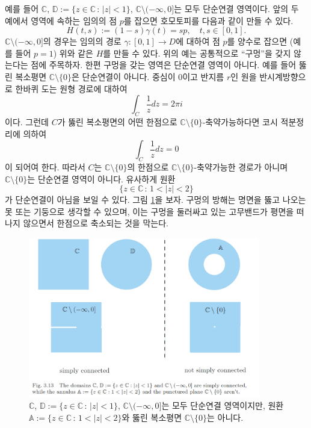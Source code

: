 예를 들어 $\mathbb C$, $\mathbb D:=\{z\in\mathbb C\,:\, |z|<1\}$,
$\mathbb C\setminus(-\infty,0]$는 모두 단순연결 영역이다.
앞의 두 예에서 영역에 속하는 임의의 점 $p$를 잡으면 호모토피를 다음과 같이 만들 수 있다.
\[
H(t,s) := (1-s)\gamma(t) = sp, \quad t,s\in[0,1].
\]
$\mathbb C\setminus(-\infty,0]$의 경우는
임의의 경로 $\gamma: [0,1] \to D$에 대하여
점 $p$를 양수로 잡으면 (예를 들어 $p=1$) 위와 같은 $H$를 만들 수 있다.
위의 예는 공통적으로 ``구멍''을 갖지 않는다는 점에 주목하자.
한편 구멍을 갖는 영역은 단순연결 영역이 아니다. 예를 들어
뚫린 복소평면 $\mathbb C\setminus \{0\}$은 단순연결이 아니다.
중심이 $0$이고 반지름 $r$인 원을 반시계방향으로 한바퀴 도는 원형 경로에 대하여
\[
\int_C \dfrac 1z dz = 2\pi i
\]
이다. 그런데 $C$가 뚫린 복소평면의 어떤 한점으로 
$\mathbb C\setminus \{0\}$-축약가능하다면
코시 적분정리에 의하여
\[
\int_C \dfrac 1z dz = 0
\]
이 되어여 한다.
따라서 $C$는 $\mathbb C\setminus \{0\}$의 한점으로 $\mathbb C\setminus \{0\}$-축약가능한 
경로가 아니며 $\mathbb C\setminus \{0\}$는 단순연결 영역이 아니다.
유사하게 원환
\[
\{ z\in\mathbb C \,:\,  1<|z|<2 \}
\]
가 단순연결이 아님을 보일 수 있다.
그림 \ref{fig-3-13}을 보자.
구멍의 방해는 명면을 뚫고 나오는 못 또는 기둥으로 생각할 수 있으며,
이는 구멍을 둘러싸고 있는 고무밴드가 평면을 떠나지 않으면서
한점으로 축소되는 것을 막는다.
\begin{figure}[!h]
\begin{center}
\includegraphics[width=0.9\textwidth]{./SaltChapter/fig-3-13}
\end{center}
\caption{$\mathbb C$, $\mathbb D:=\{z\in\mathbb C\,:\, |z|<1\}$,
$\mathbb C\setminus(-\infty,0]$는 모두 단순연결 영역이지만,
원환 $\mathbb A:= \{ z\in\mathbb C \,:\,  1<|z|<2 \}$와 
뚫린 복소평면 $\mathbb C\setminus \{0\}$는 아니다.}
\label{fig-3-13}
\end{figure}

